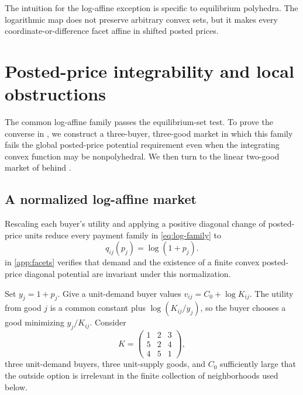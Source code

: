 \documentclass[11pt,a4paper,fleqn]{article}
\theoremstyle{plain}
\theoremstyle{definition}
\begin{document}
The intuition for the log-affine exception is specific to equilibrium polyhedra. The logarithmic map does not preserve arbitrary convex sets, but it makes every coordinate-or-difference facet affine in shifted posted prices.

\section{Posted-price integrability and local obstructions}\label{sec:holonomy}

The common log-affine family passes the equilibrium-set test. To prove the converse in , we construct a three-buyer, three-good market in which this family fails the global posted-price potential requirement even when the integrating convex function may be nonpolyhedral. We then turn to the linear two-good market of  behind .

\subsection{A normalized log-affine market}\label{subsec:normalized-log-market}

Rescaling each buyer's utility and applying a positive diagonal change of posted-price units reduce every payment family in \eqref{eq:log-family} to
\begin{equation}\label{eq:normalized-log}
q_{ij}(p_j)=\log(1+p_j).
\end{equation}
 in \ref{app:facets} verifies that demand and the existence of a finite convex posted-price diagonal potential are invariant under this normalization.

Set $y_j=1+p_j$. Give a unit-demand buyer values $v_{ij}=C_0+\log K_{ij}$. The utility from good $j$ is a common constant plus $\log(K_{ij}/y_j)$, so the buyer chooses a good minimizing $y_j/K_{ij}$. Consider
\begin{equation}\label{eq:K-matrix}
K=
\begin{pmatrix}
1&2&3\\
5&2&4\\
4&5&1
\end{pmatrix},
\end{equation}
three unit-demand buyers, three unit-supply goods, and $C_0$ sufficiently large that the outside option is irrelevant in the finite collection of neighborhoods used below.
\end{document}
